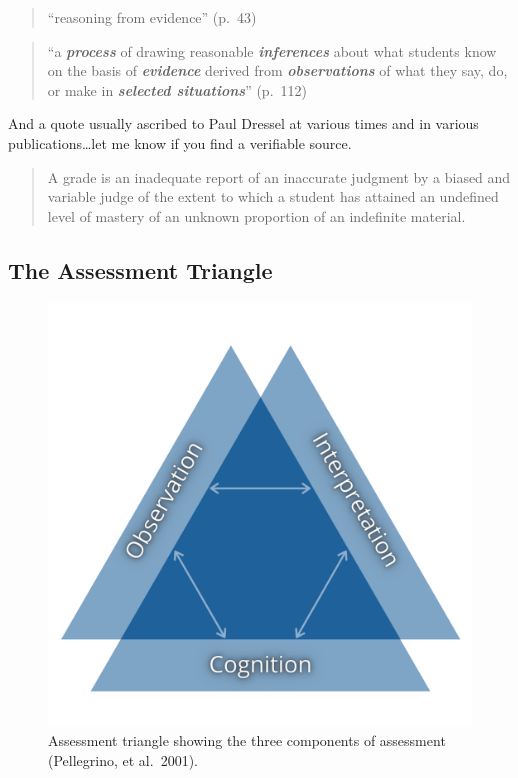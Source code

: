 \documentclass[
]{book}
\begin{document}
\begin{quote}
``reasoning from evidence'' (p.~43)
\end{quote}

\begin{quote}
``a \textbf{\emph{process}} of drawing reasonable \textbf{\emph{inferences}} about what students know on the basis of \textbf{\emph{evidence}} derived from \textbf{\emph{observations}} of what they say, do, or make in \textbf{\emph{selected situations}}'' (p.~112)
\end{quote}

And a quote usually ascribed to Paul Dressel at various times and in various publications\ldots let me know if you find a verifiable source.

\begin{quote}
A grade is an inadequate report of an inaccurate judgment by a biased and variable judge of the extent to which a student has attained an undefined level of mastery of an unknown proportion of an indefinite material.
\end{quote}

\hypertarget{the-assessment-triangle}{%
\subsection{The Assessment Triangle}\label{the-assessment-triangle}}

\begin{figure}
\centering
\includegraphics{assets/otessa22/assessment-triangle.png}
\caption{Assessment triangle showing the three components of assessment (Pellegrino, et al.~2001).}
\end{figure}
\end{document}

